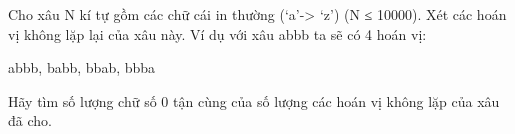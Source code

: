Cho xâu N kí tự gồm các chữ cái in thường (‘a’-> ‘z’) (N   ≤ 10000). Xét các hoán vị không lặp lại của xâu này. Ví   dụ với xâu abbb ta sẽ có 4 hoán vị:  

   abbb, babb, bbab, bbba  

   Hãy tìm số lượng chữ số 0 tận cùng của số lượng các   hoán vị không lặp của xâu đã cho.